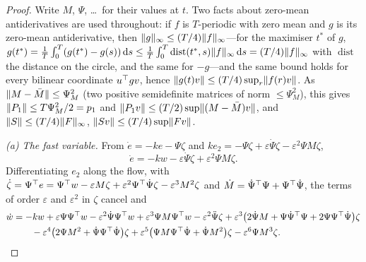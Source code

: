 \begin{proof}
Write $M$, $\Psi$, \dots\ for their values at $t$. Two facts about zero-mean antiderivatives are used throughout: if
$f$ is $T$-periodic with zero mean and $g$ is its zero-mean antiderivative, then
$\lVert g\rVert_\infty\le(T/4)\lVert f\rVert_\infty$---for the maximiser $t^*$ of $g$,
$g(t^*)=\frac1T\int_0^T(g(t^*)-g(s))\,\mathrm{d} s\le\frac1T\int_0^T\operatorname{dist}(t^*,s)\lVert f\rVert_\infty\,\mathrm{d} s
=(T/4)\lVert f\rVert_\infty$ with $\operatorname{dist}$ the distance on the circle, and the same for $-g$---and the same
bound holds for every bilinear coordinate $u^\top gv$, hence $\lVert g(t)v\rVert\le(T/4)\sup_r\lVert f(r)v\rVert$. As
$\lVert M-\bar M\rVert\le\Psi_M^2$ (two positive semidefinite matrices of norm $\le\Psi_M^2$), this gives
$\lVert P_1\rVert\le T\Psi_M^2/2=p_1$ and $\lVert P_1v\rVert\le(T/2)\sup\lVert (M-\bar M)v\rVert$, and $\lVert S\rVert\le(T/4)\lVert F\rVert_\infty$,
$\lVert Sv\rVert\le(T/4)\sup\lVert Fv\rVert$.

\noindent\emph{(a) The fast variable.} From $\dot e=-ke-\Psi\zeta$ and
$ke_2=-\Psi\zeta+\varepsilon\dot\Psi\zeta-\varepsilon^2\Psi M\zeta$,
\[
  \dot e=-kw-\varepsilon\dot\Psi\zeta+\varepsilon^2\Psi M\zeta.
\]
Differentiating $e_2$ along the flow, with
$\dot\zeta=\Psi^\top e=\Psi^\top w-\varepsilon M\zeta+\varepsilon^2\Psi^\top\dot\Psi\zeta-\varepsilon^3M^2\zeta$ and
$\dot M=\dot\Psi^\top\Psi+\Psi^\top\dot\Psi$, the terms of order $\varepsilon$ and $\varepsilon^2$ in $\zeta$ cancel and
\begin{align*}
  \dot w&=-kw+\varepsilon\Psi\Psi^\top w-\varepsilon^2\dot\Psi\Psi^\top w+\varepsilon^3\Psi M\Psi^\top w
    -\varepsilon^2\ddot\Psi\zeta+\varepsilon^3\bigl(2\dot\Psi M+\Psi\dot\Psi^\top\Psi+2\Psi\Psi^\top\dot\Psi\bigr)\zeta\\
  &\qquad-\varepsilon^4\bigl(2\Psi M^2+\dot\Psi\Psi^\top\dot\Psi\bigr)\zeta
    +\varepsilon^5\bigl(\Psi M\Psi^\top\dot\Psi+\dot\Psi M^2\bigr)\zeta-\varepsilon^6\Psi M^3\zeta.
\end{align*}


\end{proof}
